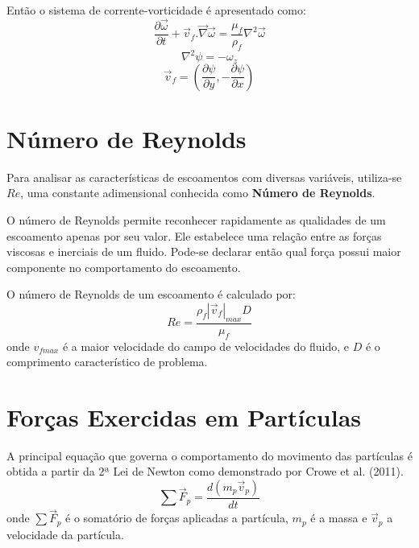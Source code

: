 Então o sistema de corrente-vorticidade é apresentado como:
\begin{equation}
	\dfrac{\partial \vec{\omega}}{\partial t} +
	\vec{v}_f.\vec{\nabla}\vec{\omega} =
    \dfrac{\mu_f}{\rho_f} \nabla^2 \vec{\omega}
    \label{fluid_eq1}
\end{equation}
\begin{equation}
	\nabla^2\psi =
	-\omega_z
    \label{fluid_eq2}
\end{equation}
\begin{equation}
	\vec{v}_f = \left(\dfrac{\partial \psi}{\partial y},
	-\dfrac{\partial \psi}{\partial x} \right)
    \label{fluid_eq3}
\end{equation}


\section{\textbf{Número de Reynolds}}
\label{sec_reynolds}
Para analisar as características de escoamentos com diversas variáveis, utiliza-se $Re$, uma constante adimensional conhecida como \textbf{Número de Reynolds}.

O número de Reynolds permite reconhecer rapidamente as qualidades de um escoamento apenas por seu valor.
Ele estabelece uma relação entre as forças viscosas e inerciais de um fluido.
Pode-se declarar então qual força possui maior componente no comportamento do escoamento.

O número de Reynolds de um escoamento é calculado por:
\begin{equation}
    Re = \dfrac{\rho_f |\vec{v}_{f}|_{max} D}{\mu_f} 
    \label{reynolds}
\end{equation}
onde $v_{fmax}$ é a maior velocidade do campo de velocidades do fluido, e $D$ é o comprimento característico de problema.


\section{\textbf{Forças Exercidas em Partículas}}
\label{sec_eq_part}
A principal equação que governa o comportamento do movimento das partículas é obtida a partir da 2ª Lei de Newton como demonstrado por Crowe et al. (2011)\cite{crowe}.
\begin{equation}
    \sum\vec{F}_{p} = \dfrac{d(m_p\vec{v}_p)}{dt}
    \label{newton} 
\end{equation}
onde $\sum\vec{F}_{p}$ é o somatório de forças aplicadas a partícula, $m_p$ é a massa e $\vec{v}_p$ a velocidade da partícula.

